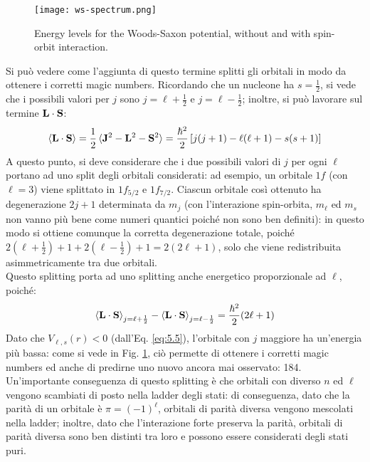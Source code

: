 \begin{figure}[!b]
	\centering
	\texttt{[image: ws-spectrum.png]}
	\caption{Energy levels for the Woods-Saxon potential, without and with spin-orbit interaction.}
	\label{ws-sp}
\end{figure}

Si può vedere come l'aggiunta di questo termine splitti gli orbitali in modo da ottenere i corretti magic numbers. Ricordando che un nucleone ha $ s = \frac{1}{2} $, si vede che i possibili valori per $ j $ sono $ j = \ell + \frac{1}{2} $ e $ j = \ell - \frac{1}{2} $; inoltre, si può lavorare sul termine $ \mathbf{L}\cdot\mathbf{S} $:
\begin{equation*}
	\braket{\mathbf{L}\cdot\mathbf{S}} = \frac{1}{2} \braket{\mathbf{J}^2 - \mathbf{L}^2 - \mathbf{S}^2} = \frac{\hbar^2}{2} \left[ j (j + 1) - \ell (\ell + 1) - s (s + 1) \right]
\end{equation*}
A questo punto, si deve considerare che i due possibili valori di $ j $ per ogni $ \ell $ portano ad uno split degli orbitali considerati: ad esempio, un orbitale $ 1f $ (con $ \ell = 3 $) viene splittato in $ 1f_{5/2} $ e $ 1f_{7/2} $. Ciascun orbitale così ottenuto ha degenerazione $ 2j + 1 $ determinata da $ m_j $ (con l'interazione spin-orbita, $ m_{\ell} $ ed $ m_s $ non vanno più bene come numeri quantici poiché non sono ben definiti): in questo modo si ottiene comunque la corretta degenerazione totale, poiché $ 2(\ell + \frac{1}{2}) + 1 + 2(\ell - \frac{1}{2}) + 1 = 2(2\ell + 1) $, solo che viene redistribuita asimmetricamente tra due orbitali.\\
Questo splitting porta ad uno splitting anche energetico proporzionale ad $ \ell $, poiché:
\begin{equation}
	\braket{\mathbf{L}\cdot\mathbf{S}}_{j = \ell + \frac{1}{2}} - \braket{\mathbf{L}\cdot\mathbf{S}}_{j = \ell - \frac{1}{2}} = \frac{\hbar^2}{2} (2\ell + 1)
	\label{eq:5.6}
\end{equation}
Dato che $ V_{\ell,s}(r) < 0 $ (dall'Eq. \ref{eq:5.5}), l'orbitale con $ j $ maggiore ha un'energia più bassa: come si vede in Fig. \ref{ws-sp}, ciò permette di ottenere i corretti magic numbers ed anche di predirne uno nuovo ancora mai osservato: 184.\\
Un'importante conseguenza di questo splitting è che orbitali con diverso $ n $ ed $ \ell $ vengono scambiati di posto nella ladder degli stati: di conseguenza, dato che la parità di un orbitale è $ \pi = (-1)^{\ell} $, orbitali di parità diversa vengono mescolati nella ladder; inoltre, dato che l'interazione forte preserva la parità, orbitali di parità diversa sono ben distinti tra loro e possono essere considerati degli stati puri.


